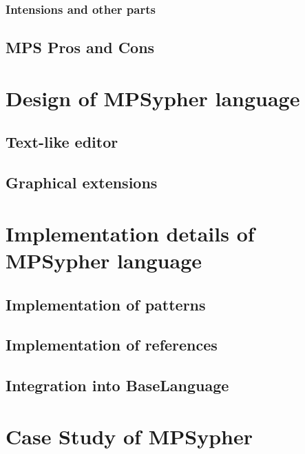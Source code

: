 \subsection{Intensions and other parts}

\section{MPS Pros and Cons}



\chapter{Design of MPSypher language}

\section{Text-like editor}

\section{Graphical extensions}



\chapter{Implementation details of MPSypher language}

\section{Implementation of patterns}

\section{Implementation of references}

\section{Integration into BaseLanguage}



\chapter{Case Study of MPSypher}